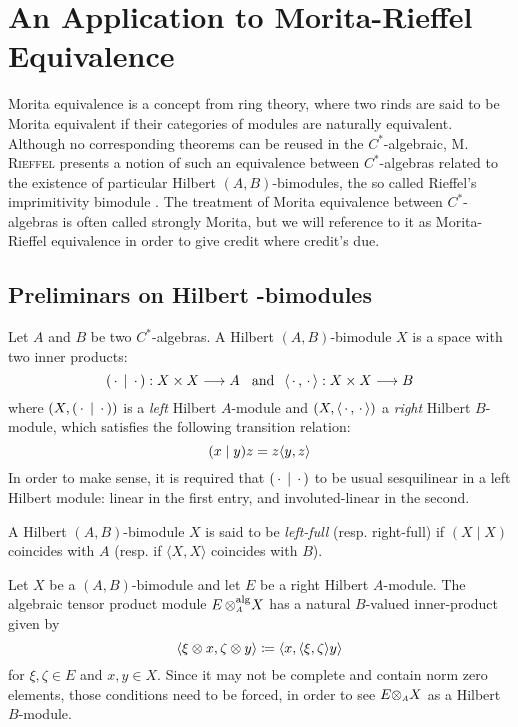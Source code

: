 \chapter{An Application to Morita-Rieffel Equivalence}

Morita equivalence is a concept from ring theory, where two rinds are said to be Morita equivalent if their categories of modules are naturally equivalent. Although no corresponding theorems can be reused in the $C^*$-algebraic, \textsc{M. Rieffel} presents a notion of such an equivalence between $C^*$-algebras related to the existence of particular Hilbert $(A,B)$-bimodules, the so called Rieffel's imprimitivity bimodule \cite{rieffel1981c,RIEFFEL1974176, brown1977stable}. The treatment of Morita equivalence between $C^*$-algebras is often called strongly Morita, but we will reference to it as Morita-Rieffel equivalence in order to give credit where credit's due.

\section[Preliminars on Hilbert \texorpdfstring{\ensuremath{C^*}}{C*}-bimodules]{Preliminars on Hilbert \texorpdfstring{}{C*}-bimodules}

Let $A$ and $B$ be two $C^*$-algebras. A Hilbert $(A,B)$-bimodule $X$ is a space with two inner products:
\begin{equation*}
	(\operatorname{\,\cdot\,}\mid\operatorname{\,\cdot\,}):X\times X \longrightarrow A \hspace{0.25cm}\operatorname{and}\hspace{0.25cm} \langle {\operatorname{\,\cdot\,}},{\operatorname{\,\cdot\,}}\rangle:X\times X \longrightarrow B
\end{equation*} 
where $\left(X, (\operatorname{\,\cdot\,}\mid\operatorname{\,\cdot\,})\right)$ is a \textit{left} Hilbert $A$-module and $\left(X, \langle {\operatorname{\,\cdot\,}},{\operatorname{\,\cdot\,}}\rangle\right)$ a \textit{right} Hilbert $B$-module, which satisfies the following transition relation:
\begin{equation*}
	(x\mid y)z = z \langle {y},{z}\rangle
\end{equation*}
In order to make sense, it is required that $(\operatorname{\,\cdot\,}\mid\operatorname{\,\cdot\,})$ to be usual sesquilinear in a left Hilbert module: linear in the first entry, and involuted-linear in the second.

\begin{definicao}
	A Hilbert $(A,B)$-bimodule $X$ is said to be \textit{left-full} (resp. right-full) if $(X \mid X)$ coincides with $A$ (resp. if $\langle X, X\rangle$ coincides with $B$).
\end{definicao}

Let $X$ be a $(A,B)$-bimodule and let $E$ be a right Hilbert $A$-module. The algebraic tensor product module $E\,\sub\otimes A^{\text{alg}} X$ has a natural $B$-valued inner-product given by
\begin{equation*}
	\langle {\xi\otimes x},{\zeta \otimes y}\rangle \coloneqq \langle {x},{\langle {\xi},{\zeta}\rangle y}\rangle
\end{equation*}
for $\xi,\zeta\in E$ and $x,y\in X$. Since it may not be complete and contain norm zero elements, those conditions need to be forced, in order to see $E \sub\otimes A X$ as a Hilbert $B$-module.

